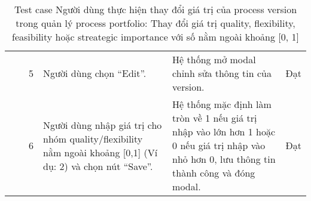 \begin{table}[H]
{\begin{tabular}{|p{3cm}|p{1.5cm}|p{0.5cm}|p{4cm}|p{4cm}|>{\centering\arraybackslash}p{1cm}|}
            &
            &
            \multicolumn{1}{c|}{5} &
            Người dùng chọn “Edit”. &
            Hệ thống mở modal chỉnh sửa thông tin của version. &
            Đạt \\ \cline{3-6} 
            &
            &
            \multicolumn{1}{c|}{6} &
            Người dùng nhập giá trị cho nhóm quality/flexibility nằm ngoài khoảng [0,1] (Ví dụ: 2) và chọn nút “Save”. &
            Hệ thống mặc định làm tròn về 1 nếu giá trị nhập vào lớn hơn 1 hoặc 0 nếu giá trị nhập vào nhỏ hơn 0, lưu thông tin thành công và đóng modal. &
            Đạt \\ \cline{3-6} \hline
        \end{tabular}
    }
    \caption{Test case Người dùng thực hiện thay đổi giá trị của process version trong quản lý process portfolio: Thay đổi giá trị quality, flexibility, feasibility hoặc streategic importance với số nằm ngoài khoảng [0, 1]}
\end{table}

